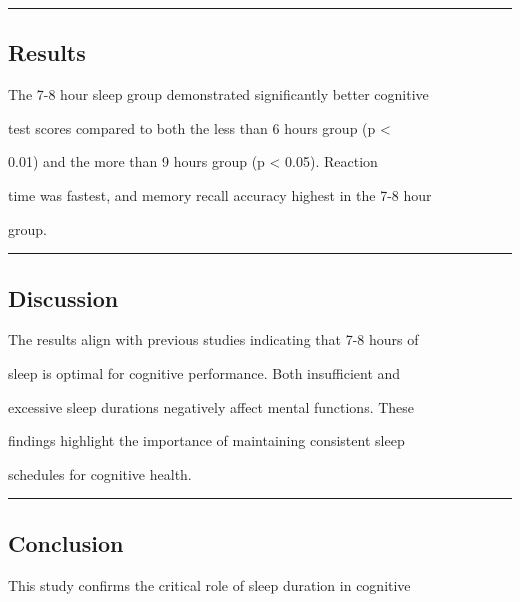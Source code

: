 \documentclass{article}
\begin{document}
\begin{center}\rule{0.5\linewidth}{0.5pt}\end{center}



\subsection{Results}\label{results}



The 7-8 hour sleep group demonstrated significantly better cognitive

test scores compared to both the less than 6 hours group (p \textless{}

0.01) and the more than 9 hours group (p \textless{} 0.05). Reaction

time was fastest, and memory recall accuracy highest in the 7-8 hour

group.



\begin{center}\rule{0.5\linewidth}{0.5pt}\end{center}



\subsection{Discussion}\label{discussion}



The results align with previous studies indicating that 7-8 hours of

sleep is optimal for cognitive performance. Both insufficient and

excessive sleep durations negatively affect mental functions. These

findings highlight the importance of maintaining consistent sleep

schedules for cognitive health.



\begin{center}\rule{0.5\linewidth}{0.5pt}\end{center}



\subsection{Conclusion}\label{conclusion}



This study confirms the critical role of sleep duration in cognitive
\end{document}
